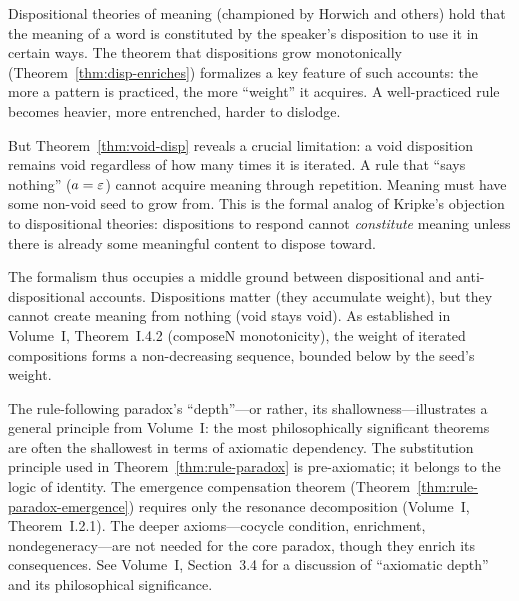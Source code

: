 \begin{interpretation}
Dispositional theories of meaning (championed by Horwich and others) hold that
the meaning of a word is constituted by the speaker's disposition to use it in
certain ways. The theorem that dispositions grow monotonically
(Theorem~\ref{thm:disp-enriches}) formalizes a key feature of such accounts:
the more a pattern is practiced, the more ``weight'' it acquires. A well-practiced
rule becomes heavier, more entrenched, harder to dislodge.

But Theorem~\ref{thm:void-disp} reveals a crucial limitation: a void
disposition remains void regardless of how many times it is iterated. A rule
that ``says nothing'' ($a = \varepsilon$) cannot acquire meaning through repetition.
Meaning must have some non-void seed to grow from. This is the formal analog of
Kripke's objection to dispositional theories: dispositions to respond cannot
\emph{constitute} meaning unless there is already some meaningful content to
dispose toward.

The formalism thus occupies a middle ground between dispositional and
anti-dispositional accounts. Dispositions matter (they accumulate weight),
but they cannot create meaning from nothing (void stays void). As established
in Volume~I, Theorem~I.4.2 (composeN monotonicity), the weight of iterated
compositions forms a non-decreasing sequence, bounded below by the seed's
weight.
\end{interpretation}

\begin{remark}
The rule-following paradox's ``depth''---or rather, its shallowness---illustrates
a general principle from Volume~I: the most philosophically significant
theorems are often the shallowest in terms of axiomatic dependency. The
substitution principle used in Theorem~\ref{thm:rule-paradox} is pre-axiomatic;
it belongs to the logic of identity. The emergence compensation theorem
(Theorem~\ref{thm:rule-paradox-emergence}) requires only the resonance
decomposition (Volume~I, Theorem~I.2.1). The deeper axioms---cocycle condition,
enrichment, nondegeneracy---are not needed for the core paradox, though they
enrich its consequences. See Volume~I, Section~3.4 for a discussion of
``axiomatic depth'' and its philosophical significance.
\end{remark}



